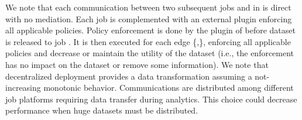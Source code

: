 We note that each communication between two subsequent jobs  and  in \coalition{} is direct with no mediation. Each job is complemented with an external plugin enforcing all applicable policies. Policy enforcement is done by the plugin of  before dataset \dataset{} is released to job . It is then executed for each edge \{,\}, enforcing all applicable policies and decrease or maintain the utility of the dataset (i.e., the enforcement has no impact on the dataset or remove some information). We note that decentralized deployment provides a data transformation assuming a not-increasing monotonic behavior. Communications are distributed among different job platforms requiring data transfer during analytics. This choice could decrease performance when huge datasets must be distributed. 
